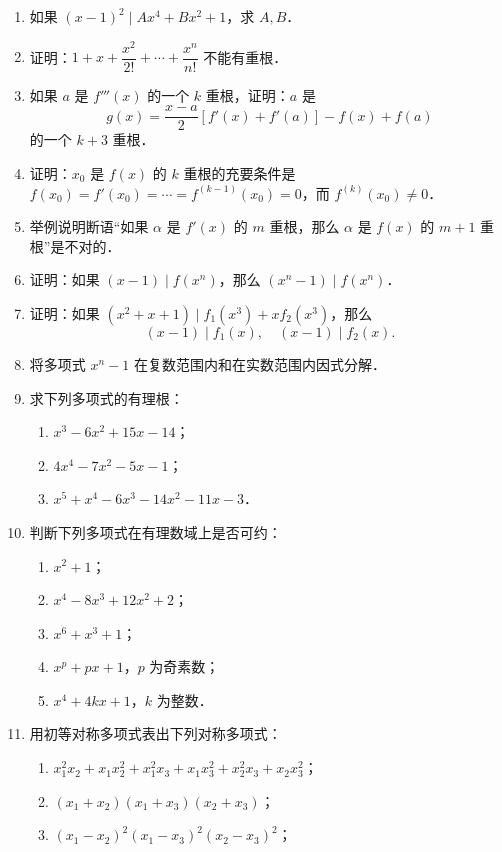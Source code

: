\begin{enumerate}
  \anscompute
  \item 如果 $(x-1)^2\mid Ax^4+Bx^2+1$，求 $A,B$．
  \anscompute
  \item 证明：$1+x+\dfrac{x^2}{2!}+\cdots+\dfrac{x^n}{n!}$ 不能有重根．
  \ansproof
  \item 如果 $a$ 是 $f'''(x)$ 的一个 $k$ 重根，证明：$a$ 是
  \[
    g(x)=\frac{x-a}{2}\left[f'(x)+f'(a)\right]-f(x)+f(a)
  \]
  的一个 $k+3$ 重根．
  \ansproof
  \item 证明：$x_0$ 是 $f(x)$ 的 $k$ 重根的充要条件是 $f(x_0)=f'(x_0)=\cdots=f^{(k-1)}(x_0)=0$，而 $f^{(k)}(x_0)\neq 0$．
  \ansproof
  \item 举例说明断语“如果 $\alpha$ 是 $f'(x)$ 的 $m$ 重根，那么 $\alpha$ 是 $f(x)$ 的 $m+1$ 重根”是不对的．
  \ansgeneral
  \item 证明：如果 $(x-1)\mid f(x^n)$，那么 $(x^n-1)\mid f(x^n)$．
  \ansproof
  \item 证明：如果 $(x^2+x+1)\mid f_1(x^3)+xf_2(x^3)$，那么
  \[
    (x-1)\mid f_1(x),\quad (x-1)\mid f_2(x).
  \]
  \ansproof
  \item 将多项式 $x^n-1$ 在复数范围内和在实数范围内因式分解．
  \anscompute
  \item 求下列多项式的有理根：
  \begin{enumerate}
    \item $x^3-6x^2+15x-14$；
  \anssub
    \item $4x^4-7x^2-5x-1$；
  \anssub
    \item $x^5+x^4-6x^3-14x^2-11x-3$．
  \anssub
  \end{enumerate}
  \item 判断下列多项式在有理数域上是否可约：
  \begin{enumerate}
    \item $x^2+1$；
  \anssub
    \item $x^4-8x^3+12x^2+2$；
  \anssub
    \item $x^6+x^3+1$；
  \anssub
    \item $x^p+px+1$，$p$ 为奇素数；
  \anssub
    \item $x^4+4kx+1$，$k$ 为整数．
  \anssub
  \end{enumerate}
  \item 用初等对称多项式表出下列对称多项式：
  \begin{enumerate}
    \item $x_1^2x_2+x_1x_2^2+x_1^2x_3+x_1x_3^2+x_2^2x_3+x_2x_3^2$；
  \anssub
    \item $(x_1+x_2)(x_1+x_3)(x_2+x_3)$；
  \anssub
    \item $(x_1-x_2)^2(x_1-x_3)^2(x_2-x_3)^2$；

\end{enumerate}
\end{enumerate}
